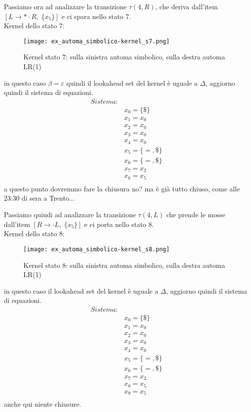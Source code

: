 \documentclass[class=book, crop=false, oneside, 12pt]{standalone}
\begin{document}
Passiamo ora ad analizzare la transizione \(\tau(4, R)\), che deriva dall'item \([L \to * \cdot R, \; \{x_5\}]\) e ci spara nello stato 7.
\\
Kernel dello stato 7:
\begin{figure}
    \centering
    \texttt{[image: ex\_automa\_simbolico-kernel\_s7.png]}
    \caption{Kernel stato 7: sulla sinistra automa simbolico, sulla destra automa LR(1)}
\end{figure}
in questo caso  \(\beta = \varepsilon\) quindi il lookahead set del kernel è uguale a \(\Delta\), aggiorno quindi il sistema di equazioni.
\begin{align*}
    Sistema:& \\
            & x_0 = \{\$\} \\
            & x_1 = x_0 \\
            & x_2 = x_0 \\
            & x_3 = x_0 \\
            & x_4 = x_0 \\
            & x_5 = \{=, \$\} \\
            & x_6 = \{=, \$\} \\
            & x_7 = x_2 \\
            & x_8 = x_5 \\
\end{align*}
a questo punto dovremmo fare la chiusura no? ma è già tutto chiuso, come alle 23:30 di sera a Trento...

Passiamo quindi ad analizzare la transizione \(\tau(4, L)\) che prende le mosse dall'item \([R \to \cdot L, \; \{x_5\}]\) e ci porta nello stato 8.
\\
Kernel dello stato 8:
\begin{figure}
    \centering
    \texttt{[image: ex\_automa\_simbolico-kernel\_s8.png]}
    \caption{Kernel stato 8: sulla sinistra automa simbolico, sulla destra automa LR(1)}
\end{figure}
in questo caso il lookahead set del kernel è uguale a \(\Delta\), aggiorno quindi il sistema di equazioni.
\begin{align*}
    Sistema:& \\
            & x_0 = \{\$\} \\
            & x_1 = x_0 \\
            & x_2 = x_0 \\
            & x_3 = x_0 \\
            & x_4 = x_0 \\
            & x_5 = \{=, \$\} \\
            & x_6 = \{=, \$\} \\
            & x_7 = x_2 \\
            & x_8 = x_5 \\
            & x_9 = x_5 \\
\end{align*}
anche qui niente chiusure.
\end{document}
